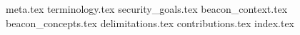 {meta.tex}
{terminology.tex}
{security_goals.tex}
{beacon_context.tex}
{beacon_concepts.tex}
{delimitations.tex}
{contributions.tex}
{index.tex}
